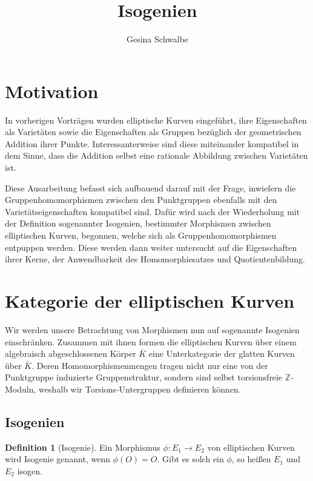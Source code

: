 \documentclass[english, german, parskip=half]{scrartcl}
\title{Isogenien}
\author{Gesina Schwalbe}
\theoremstyle{definition}
\newtheorem{Definition}[Satz]{Definition}
\theoremstyle{remark}
\newcommand*{\Z}{\mathds{Z}}
\newcommand*{\algK}{\ensuremath{\overline K}} %
\renewcommand{\O}{O}
\begin{document}
\maketitle
\tableofcontents

\section{Motivation}
In vorherigen Vorträgen wurden elliptische Kurven eingeführt, ihre
Eigenschaften als Varietäten sowie die Eigenschaften als Gruppen
bezüglich der geometrischen Addition ihrer Punkte.
Interessanterweise sind diese miteinander kompatibel in dem Sinne,
dass die Addition selbst eine rationale Abbildung zwischen Varietäten
ist.

Diese Ausarbeitung befasst sich aufbauend darauf mit der Frage,
inwiefern die Gruppenhomomorphismen zwischen den Punktgruppen
ebenfalls mit den Varietätseigenschaften kompatibel sind.
Dafür wird nach der Wiederholung mit der Definition sogenannter
Isogenien, bestimmter Morphismen zwischen elliptischen Kurven,
begonnen, welche sich als Gruppenhomomorphismen entpuppen werden.
Diese werden dann weiter untersucht auf die Eigenschaften ihrer Kerne,
der Anwendbarkeit des Homomorphiesatzes und Quotientenbildung.




\section{Kategorie der elliptischen Kurven}
Wir werden unsere Betrachtung von Morphismen nun auf sogenannte
Isogenien einschränken. Zusammen mit ihnen formen die elliptischen
Kurven über einem algebraisch abgeschlossenen Körper $\algK$ eine
Unterkategorie der glatten Kurven über $\algK$.
Deren Homomorphismenmengen tragen nicht nur eine von der Punktgruppe
induzierte Gruppenstruktur, sondern sind selbst torsionsfreie
$\Z$-Moduln, weshalb wir Torsions-Untergruppen definieren können.


\subsection{Isogenien}
\begin{Definition}[Isogenie]
  Ein Morphismus $\phi\colon E_1\to E_2$ von elliptischen Kurven wird
  Isogenie genannt, wenn $\phi(\O)=\O$.
  Gibt es solch ein $\phi$, so heißen $E_1$ und $E_2$ isogen.
\end{Definition}
\end{document}
